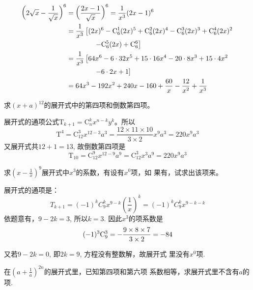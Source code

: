 \begin{solution}
\[\begin{split}
    \left(2\sqrt{x}-\frac{1}{\sqrt{x}}\right)^6&=\left(\frac{2x-1}{\sqrt{x}}\right)^6 =\frac{1}{x^3}(2x-1)^6\\
&=\frac{1}{x^3}\left[(2x)^6-\comb{1}{6}(2x)^5+\comb{2}{6}(2x)^4-\comb{3}{6}(2x)^3+\comb{4}{6}(2x)^2\right.\\
&\qquad \qquad \left.-\comb{5}{6}(2x)+\comb{6}{6}\right]\\
&=\frac{1}{x^3}\left[64x^6-6\cdot 32x^5+15\cdot 16x^4-20\cdot 8 x^3+15\cdot 4x^2\right.\\
&\qquad \qquad \left.-6\cdot 2x+1\right]\\
&=64x^3-192x^2+240x-160+\frac{60}{x}-\frac{12}{x^2}+\frac{1}{x^3}
\end{split}\]
\end{solution}

\begin{example}
    求$(x+a)^{12}$的展开式中的第四项和倒数第四项。
\end{example}

\begin{solution}
    展开式的通项公式$\mathrm{T}_{k+1}=\mathrm{C}_n^k x^{n-k}y^k$。所以
$$\mathrm{T}^{4}=\mathrm{C}_{12}^{3} x^{12-3} a^{3}=\frac{12\times11\times 10}{3\times2}x^{9} a^{3}=220x^{9} a^{3}$$
又展开式共$12+1=13$, 故倒数第四项是
$$\mathrm{T}_{10}=\mathrm{C}_{12}^{9} x^{12-9} a^{9}=\mathrm{C}_{12}^{3}x^{3} a^{9}=220x^{9} a^{3}$$
\end{solution}

\begin{example}
  求$(x-\frac{1}{x})^{9}$展开式中$x^3$的系数，有设有$x^{0}$项，如
果有，试求出该项来。  
\end{example}

\begin{solution}
    展开式的通项是：
$$T_{k+1} = ( -1 )^{k} C_{9}^{k} x^{9-k} (\frac{1}{x})^{k}=( -1)^{k} C_{9}^{k} x^{9-k-k}$$
依题意有，$9-2k=3$, 所以$k=3$. 因此$x^3$的项系数是
$$( -1 )^{3}{\rm C}_{9}^{3}=- \frac{9\times8\times7}{3\times2}=- 84$$

又若$9-2k=0$, 即$2k=9$, 方程没有整数解，故展开式
里没有$x^0$项.
\end{solution}

\begin{example}
   在$\left(a+\frac1a\right)^{2n}$的展开式里，已知第四项和第六项
系数相等，求展开式里不含有$a$的项. 
\end{example}

